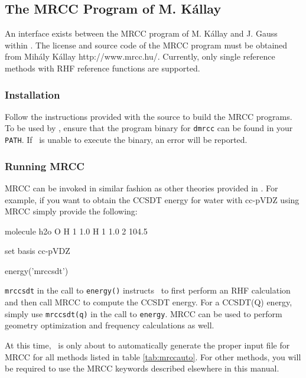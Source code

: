 \subsection{The MRCC Program of M. K\'{a}llay} \label{mrcc}
An interface exists between the MRCC program of M. K\'{a}llay and J. Gauss within \PSIfour.  The license and source code of the MRCC program must be obtained from Mih\'{a}ly K\'{a}llay http://www.mrcc.hu/. Currently, only single reference methods with RHF reference functions are supported.

\subsubsection{Installation}
Follow the instructions provided with the source to build the MRCC programs. To be used by \PSIfour, ensure that the program binary for {\tt dmrcc} can be found in your {\tt PATH}. If \PSIfour\ is unable to execute the binary, an error will be reported.

\subsubsection{Running MRCC}
MRCC can be invoked in similar fashion as other theories provided in \PSIfour. For example, if you want to obtain the CCSDT energy for water with cc-pVDZ using MRCC simply provide the following:

\begin{Snippet}
molecule h2o {
    O
    H 1 1.0
    H 1 1.0 2 104.5
}

set {
    basis cc-pVDZ
}

energy('mrccsdt')
\end{Snippet}

{\tt mrccsdt} in the call to {\tt energy()} instructs \PSIfour\ to first perform an RHF calculation and then call MRCC to compute the CCSDT energy. For a CCSDT(Q) energy, simply use {\tt mrccsdt(q)} in the call to {\tt energy}.  MRCC can be used to perform geometry optimization and frequency calculations as well.

At this time, \PSIfour\ is only about to automatically generate the proper input file for MRCC for all methods listed in table \ref{tab:mrccauto}. For other methods, you will be required to use the MRCC keywords described elsewhere in this manual.

